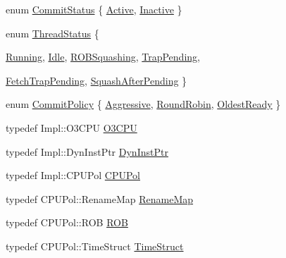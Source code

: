 \begin{DoxyCompactItemize}
\item 
enum \hyperlink{classDefaultCommit_a40bce497731b29d1d0756af6c5e40986}{CommitStatus} \{ \hyperlink{classDefaultCommit_a40bce497731b29d1d0756af6c5e40986a26bd8444261cc58df7a86753c79d2520}{Active}, 
\hyperlink{classDefaultCommit_a40bce497731b29d1d0756af6c5e40986a969c924a722daf6334fca64346092ae6}{Inactive}
 \}
\item 
enum \hyperlink{classDefaultCommit_ae2739961013a00cede621d4d72f2173c}{ThreadStatus} \{ \par
\hyperlink{classDefaultCommit_ae2739961013a00cede621d4d72f2173ca2f5f2c4a8c4f4f0519d503dcdfbf55cb}{Running}, 
\hyperlink{classDefaultCommit_ae2739961013a00cede621d4d72f2173cad3fa9ae9431d6cb1772f9d9df48cab19}{Idle}, 
\hyperlink{classDefaultCommit_ae2739961013a00cede621d4d72f2173ca55ceab70c6d1094de92189130c899d84}{ROBSquashing}, 
\hyperlink{classDefaultCommit_ae2739961013a00cede621d4d72f2173ca8c49adf6da5f507150d403610c684877}{TrapPending}, 
\par
\hyperlink{classDefaultCommit_ae2739961013a00cede621d4d72f2173ca757a5840686b21827966401ca2499141}{FetchTrapPending}, 
\hyperlink{classDefaultCommit_ae2739961013a00cede621d4d72f2173ca1f0e8d98cfb4db458b98f0b5e3f49466}{SquashAfterPending}
 \}
\item 
enum \hyperlink{classDefaultCommit_a2b5cad948a22cc08e48fe1a2226c8d05}{CommitPolicy} \{ \hyperlink{classDefaultCommit_a2b5cad948a22cc08e48fe1a2226c8d05a227598607ef691b05c9eb1ea73a06a2f}{Aggressive}, 
\hyperlink{classDefaultCommit_a2b5cad948a22cc08e48fe1a2226c8d05a5c08841de48c15133dd26a4d9d740a11}{RoundRobin}, 
\hyperlink{classDefaultCommit_a2b5cad948a22cc08e48fe1a2226c8d05a1ce7bd97138a7693d81bee46fa74a1cc}{OldestReady}
 \}
\item 
typedef Impl::O3CPU \hyperlink{classDefaultCommit_a44622cf06940413482836cb62931ac3f}{O3CPU}
\item 
typedef Impl::DynInstPtr \hyperlink{classDefaultCommit_a028ce10889c5f6450239d9e9a7347976}{DynInstPtr}
\item 
typedef Impl::CPUPol \hyperlink{classDefaultCommit_a87d662eaeb9eab249d671b63cb4ba11a}{CPUPol}
\item 
typedef CPUPol::RenameMap \hyperlink{classDefaultCommit_a341963bcea1928476182a17e357f98e3}{RenameMap}
\item 
typedef CPUPol::ROB \hyperlink{classDefaultCommit_aa480e463fb139d9966f38e3895a8b326}{ROB}
\item 
typedef CPUPol::TimeStruct \hyperlink{classDefaultCommit_ab7dd3632ef639702a5c6e7c2c3a2f82a}{TimeStruct}

\end{DoxyCompactItemize}
